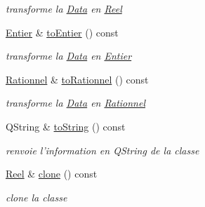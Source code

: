 \begin{DoxyCompactItemize}
\begin{DoxyCompactList}\small\item\em transforme la \hyperlink{classNombre_1_1Data}{Data} en \hyperlink{classNombre_1_1Reel}{Reel} \item\end{DoxyCompactList}\item 
\hypertarget{classNombre_1_1Reel_ae72c1aae90cae815491ccc6fc67b74a4}{
\hyperlink{classNombre_1_1Entier}{Entier} \& \hyperlink{classNombre_1_1Reel_ae72c1aae90cae815491ccc6fc67b74a4}{toEntier} () const }
\label{classNombre_1_1Reel_ae72c1aae90cae815491ccc6fc67b74a4}

\begin{DoxyCompactList}\small\item\em transforme la \hyperlink{classNombre_1_1Data}{Data} en \hyperlink{classNombre_1_1Entier}{Entier} \item\end{DoxyCompactList}\item 
\hypertarget{classNombre_1_1Reel_a2cd0dce1eb92158ba79bd8762bafbc12}{
\hyperlink{classNombre_1_1Rationnel}{Rationnel} \& \hyperlink{classNombre_1_1Reel_a2cd0dce1eb92158ba79bd8762bafbc12}{toRationnel} () const }
\label{classNombre_1_1Reel_a2cd0dce1eb92158ba79bd8762bafbc12}

\begin{DoxyCompactList}\small\item\em transforme la \hyperlink{classNombre_1_1Data}{Data} en \hyperlink{classNombre_1_1Rationnel}{Rationnel} \item\end{DoxyCompactList}\item 
\hypertarget{classNombre_1_1Reel_a21b53eb0c5fce7a2fd84ffd7ad0a1086}{
QString \& \hyperlink{classNombre_1_1Reel_a21b53eb0c5fce7a2fd84ffd7ad0a1086}{toString} () const }
\label{classNombre_1_1Reel_a21b53eb0c5fce7a2fd84ffd7ad0a1086}

\begin{DoxyCompactList}\small\item\em renvoie l'information en QString de la classe \item\end{DoxyCompactList}\item 
\hypertarget{classNombre_1_1Reel_a4317b3976cf5554211e033b88932126b}{
\hyperlink{classNombre_1_1Reel}{Reel} \& \hyperlink{classNombre_1_1Reel_a4317b3976cf5554211e033b88932126b}{clone} () const }
\label{classNombre_1_1Reel_a4317b3976cf5554211e033b88932126b}

\begin{DoxyCompactList}\small\item\em clone la classe \item\end{DoxyCompactList}\end{DoxyCompactItemize}
